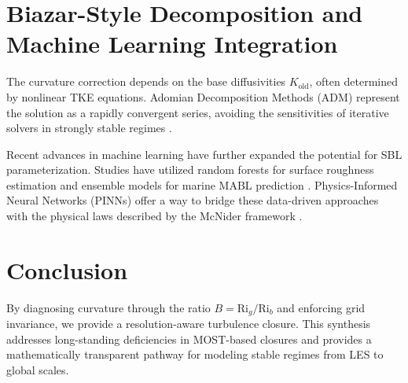 \documentclass[12pt, a4paper]{article}
\newcommand{\Rig}{\text{Ri}_g}
\newcommand{\Rib}{\text{Ri}_b}
\begin{document}
\section{Biazar-Style Decomposition and Machine Learning Integration}
The curvature correction depends on the base diffusivities $K_{\text{old}}$, often determined by nonlinear TKE equations. Adomian Decomposition Methods (ADM) \cite{England2025} represent the solution as a rapidly convergent series, avoiding the sensitivities of iterative solvers in strongly stable regimes \cite{Gryanik2020}.

Recent advances in machine learning have further expanded the potential for SBL parameterization. Studies have utilized random forests for surface roughness estimation \cite{Duan2021} and ensemble models for marine MABL prediction \cite{Chen2025}. Physics-Informed Neural Networks (PINNs) offer a way to bridge these data-driven approaches with the physical laws described by the McNider framework \cite{Raissi2019}.

\section{Conclusion}
By diagnosing curvature through the ratio $B = \Rig/\Rib$ and enforcing grid invariance, we provide a resolution-aware turbulence closure. This synthesis addresses long-standing deficiencies in MOST-based closures and provides a mathematically transparent pathway for modeling stable regimes from LES to global scales.



\end{document}
